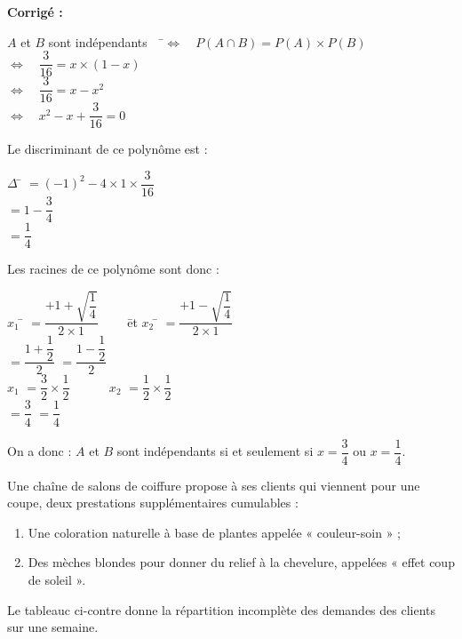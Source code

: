 \documentclass[a4paper,11pt,exos]{nsi} %
\begin{document}
\textcolor{UGLiBlue}{
    \textbf{Corrigé :}
    \begin{tabbing}
        $A$ et $B$ sont indépendants$\quad$ \=$\iff\quad P(A \cap B)=P(A) \times P(B)$\\
        \>  $\iff\quad \dfrac{3}{16}=x \times (1-x)$\\[.5em]
        \>  $\iff\quad \dfrac{3}{16}=x-x^2$\\[.5em]
        \>  $\iff\quad x^2-x+\dfrac{3}{16}=0$
    \end{tabbing}
    Le discriminant de ce polynôme est :
    \begin{tabbing}
        $\Delta$ \= $=(-1)^2-4\times 1\times \dfrac{3}{16}$\\
        \> $=1-\dfrac{3}{4}$\\
        \> $=\dfrac{1}{4}$
    \end{tabbing} 
    Les racines de ce polynôme sont donc :
    \begin{tabbing}
        $x_1$ \= $=\dfrac{+1+\sqrt{\dfrac{1}{4}}}{2\times 1}\qquad$ \= et \qquad $x_2$ \= $=\dfrac{+1-\sqrt{\dfrac{1}{4}}}{2\times 1}$\\[.5em]
        \> $=\dfrac{1+\dfrac{1}{2}}{2}$ \> \> $=\dfrac{1-\dfrac{1}{2}}{2}$\\[.5em]
        $x_1$\> $=\dfrac{3}{2}\times \dfrac{1}{2}$ \> $\phantom{et }\qquad x_2$\> $=\dfrac{1}{2}\times \dfrac{1}{2}$\\[.5em]
        \> $=\dfrac{3}{4}$ \> \> $=\dfrac{1}{4}$
    \end{tabbing}
    On a donc : $A$ et $B$ sont indépendants si et seulement si $x=\dfrac{3}{4}$ ou $x=\dfrac{1}{4}$.
}


\newpage
\setcounter{section}{0}

\maketitle

\exo{}
Une chaîne de salons de coiffure propose à ses clients qui viennent pour une coupe, deux prestations supplémentaires cumulables :
\begin{enumerate}[label=\textbullet]
    \item Une coloration naturelle à base de plantes appelée « couleur-soin » ;
    \item Des mèches blondes pour donner du relief à la chevelure, appelées « effet coup de soleil ».
\end{enumerate}
Le tableauc ci-contre donne la répartition incomplète des demandes des clients sur une semaine.\\
\end{document}
